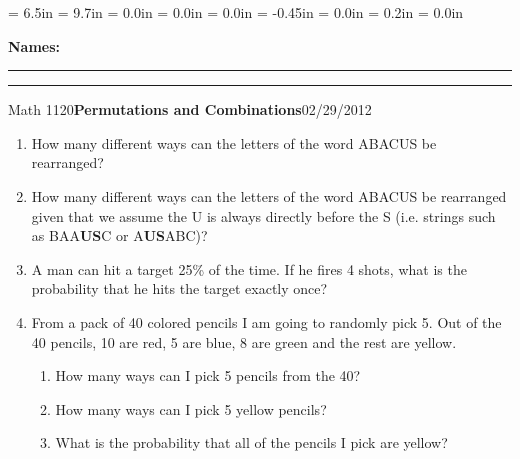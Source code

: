 \documentclass{article}
\begin{document}
\textwidth = 6.5in
\textheight = 9.7in
\oddsidemargin = 0.0in
\evensidemargin = 0.0in
\topmargin = 0.0in
\headheight = -0.45in
\headsep = 0.0in
\parskip = 0.2in
\parindent = 0.0in

\pagestyle{empty}

\textbf{Names:} \rule{6.1in}{0.01in}

\vspace{0.3in}

\noindent\rule{6.7in}{0.01in}

\centerline{Math 1120\hfill{\bf Permutations and Combinations}\hfill 02/29/2012}

\vspace{0.2in}

\begin{enumerate}

\item How many different ways can the letters of the word ABACUS be rearranged?

\vspace{2in}

\item How many different ways can the letters of the word ABACUS be rearranged given that we assume the U is always directly before the S (i.e. strings such as BAA\textbf{US}C or A\textbf{US}ABC)?

\vspace{2in}

\item A man can hit a target 25\% of the time. If he fires 4 shots, what is the probability that he hits the target exactly once?

\newpage

\item From a pack of 40 colored pencils I am going to randomly pick 5. Out of the 40 pencils, 10 are red, 5 are blue, 8 are green and the rest are yellow. 

\begin{enumerate}

\item How many ways can I pick 5 pencils from the 40?

\vspace{1in}

\item How many ways can I pick 5 yellow pencils?

\vspace{1in}

\item What is the probability that all of the pencils I pick are yellow?

\end{enumerate}

\end{enumerate}
\end{document}
